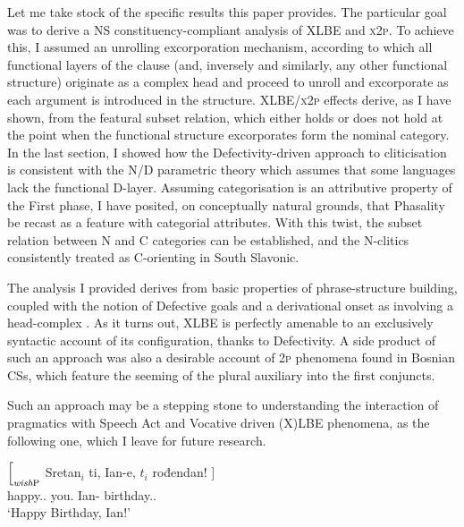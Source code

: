 \documentclass[output=paper]{langsci/langscibook}
\begin{document}
Let me take stock of the specific results this paper provides. The particular
goal was to derive a NS constituency-com\-pli\-ant analysis of XLBE and
\textsc{x2p}. To achieve this, I assumed an unrolling excorporation mechanism,
according to which all functional layers of the clause (and, inversely and
similarly, any other functional structure) originate as a complex head and
proceed to unroll and excorporate as each argument is introduced in the
structure. XLBE/\textsc{x2p} effects derive, as I have shown, from the featural
subset relation, which either holds or does not hold at the point when the
functional structure excorporates form the nominal category. In the last
section, I showed how the Defectivity-driven approach to
cliticisation is consistent with the N/D parametric theory which
assumes that some languages lack the functional D-layer. Assuming
categorisation is an attributive property of the First phase, I have
posited, on conceptually natural grounds, that Phasality be recast as a feature
with categorial attributes. With this twist, the subset relation between N and
C categories can be established, and the N-clitics consistently treated as
C-orienting in South Slavonic.

The analysis I provided derives from basic properties of phrase-structure
building, coupled with the notion of Defective goals and a derivational onset
as involving a head-complex \citep{Shimada:2007}. As it turns out, XLBE is
perfectly amenable to an exclusively syntactic account of its configuration,
thanks to  Defectivity. A side product of such an
approach was also a desirable account of \textsc{2p} phenomena found in Bosnian
CSs, which feature the seeming  of the plural
auxiliary into the first conjuncts.

Such an approach may be a stepping stone to understanding the interaction of
pragmatics with Speech Act and Vocative driven (X)LBE phenomena, as the
following one, which I leave for future research.

\begin{exe}
	\ex \gll $\Big[_{\emph{wish}\textup{P}}$ Sretan$_i$ ti, Ian-e, $t_i$ rođendan! $\Big]$ \\
    {}	happy.\M.\Sg{} you.\Dat{} Ian-\Voc{} {} birthday.\M.\Sg{} \\
    \trans	`Happy Birthday, Ian!'
\end{exe}

\printchapterglossary{}

{\sloppy
\printbibliography[heading=subbibliography,notkeyword=this]
}
\end{document}
